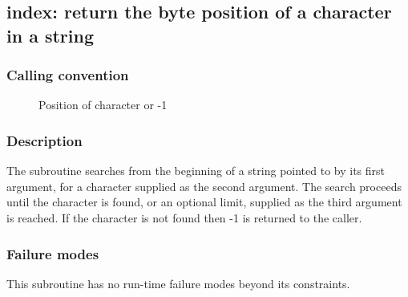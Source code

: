 \clearpage
{}
{}
\label{subr:index}
\subsection*{index: return the byte position of a character in a string}

\subsubsection*{Calling convention}

\begin{description}
\item[] Position of character or -1 
\end{description}

\subsubsection*{Description}

The  subroutine searches from the beginning of a
string pointed to by its first argument, for a character supplied as
the second argument.  The search proceeds until the character is
found, or an optional limit, supplied as the third argument is
reached.  If the character is not found then -1 is returned to the
caller.

\subsubsection*{Failure modes}

This subroutine has no run-time failure modes beyond its constraints.
